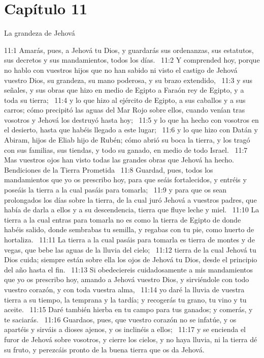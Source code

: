 \section*{Capítulo 11 }
La grandeza de Jehová  

11:1 Amarás, pues, a Jehová tu Dios, y guardarás sus ordenanzas, sus estatutos, sus decretos y sus mandamientos, todos los días.  
11:2 Y comprended hoy, porque no hablo con vuestros hijos que no han sabido ni visto el castigo de Jehová vuestro Dios, su grandeza, su mano poderosa, y su brazo extendido,  
11:3 y sus señales, y sus obras que hizo en medio de Egipto a Faraón rey de Egipto, y a toda su tierra;  
11:4 y lo que hizo al ejército de Egipto, a sus caballos y a sus carros; cómo precipitó las aguas del Mar Rojo sobre ellos, cuando venían tras vosotros y Jehová los destruyó hasta hoy;  
11:5 y lo que ha hecho con vosotros en el desierto, hasta que habéis llegado a este lugar;  
11:6 y lo que hizo con Datán y Abiram, hijos de Eliab hijo de Rubén; cómo abrió su boca la tierra, y los tragó con sus familias, sus tiendas, y todo su ganado, en medio de todo Israel.  
11:7 Mas vuestros ojos han visto todas las grandes obras que Jehová ha hecho.  
Bendiciones de la Tierra Prometida  
11:8 Guardad, pues, todos los mandamientos que yo os prescribo hoy, para que seáis fortalecidos, y entréis y poseáis la tierra a la cual pasáis para tomarla;  
11:9 y para que os sean prolongados los días sobre la tierra, de la cual juró Jehová a vuestros padres, que había de darla a ellos y a su descendencia, tierra que fluye leche y miel.  
11:10 La tierra a la cual entras para tomarla no es como la tierra de Egipto de donde habéis salido, donde sembrabas tu semilla, y regabas con tu pie, como huerto de hortaliza.  
11:11 La tierra a la cual pasáis para tomarla es tierra de montes y de vegas, que bebe las aguas de la lluvia del cielo;  
11:12 tierra de la cual Jehová tu Dios cuida; siempre están sobre ella los ojos de Jehová tu Dios, desde el principio del año hasta el fin.  
11:13 Si obedeciereis cuidadosamente a mis mandamientos que yo os prescribo hoy, amando a Jehová vuestro Dios, y sirviéndole con todo vuestro corazón, y con toda vuestra alma,  
11:14 yo daré la lluvia de vuestra tierra a su tiempo, la temprana y la tardía; y recogerás tu grano, tu vino y tu aceite.  
11:15 Daré también hierba en tu campo para tus ganados; y comerás, y te saciarás.  
11:16 Guardaos, pues, que vuestro corazón no se infatúe, y os apartéis y sirváis a dioses ajenos, y os inclinéis a ellos;  
11:17 y se encienda el furor de Jehová sobre vosotros, y cierre los cielos, y no haya lluvia, ni la tierra dé su fruto, y perezcáis pronto de la buena tierra que os da Jehová.  
